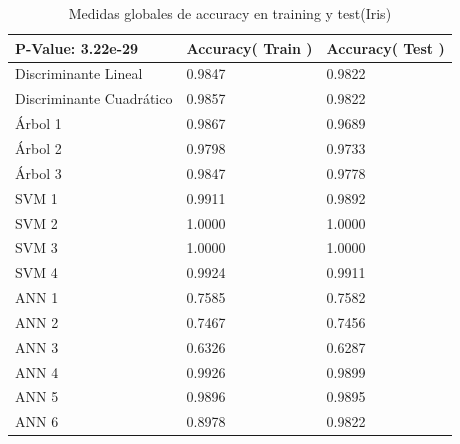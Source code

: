 \documentclass[a4paper,openwrite,12pt]{article}
\begin{document}
\begin{table}[H]
\centering
\begin{tabular}{@{}lll@{}}
\toprule
P-Value: 3.22e-29        & Accuracy( Train ) & Accuracy( Test ) \\ \midrule
Discriminante Lineal     & 0.9847            & 0.9822           \\
Discriminante Cuadrático & 0.9857            & 0.9822           \\
Árbol 1                  & 0.9867            & 0.9689           \\
Árbol 2                  & 0.9798            & 0.9733           \\
Árbol 3                  & 0.9847            & 0.9778           \\
SVM 1                    & 0.9911            & 0.9892           \\
SVM 2                    & 1.0000            & 1.0000           \\
SVM 3                    & 1.0000            & 1.0000           \\
SVM 4                    & 0.9924            & 0.9911           \\
ANN 1                    & 0.7585            & 0.7582           \\
ANN 2                    & 0.7467            & 0.7456           \\
ANN 3                    & 0.6326            & 0.6287           \\
ANN 4                    & 0.9926            & 0.9899           \\
ANN 5                    & 0.9896            & 0.9895           \\
ANN 6                    & 0.8978            & 0.9822           
\end{tabular}
\caption{Medidas globales de accuracy en training y test(Iris)}
\label{tab:global_iris}
\end{table}
\end{document}
